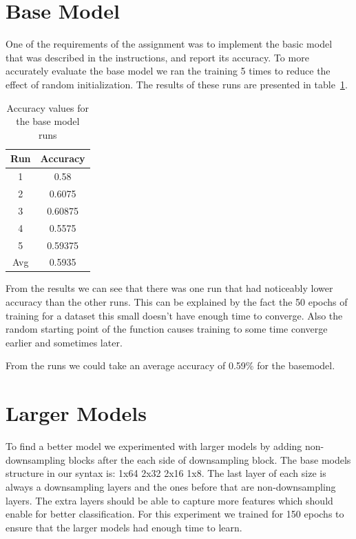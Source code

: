 \documentclass[12pt,a4paper,english
]{tunithesis}
\begin{document}
\section{Base Model}
One of the requirements of the assignment was to implement the basic model that was described in the instructions, and report its accuracy. To more accurately evaluate the base model we ran the training 5 times to reduce the effect of random initialization. The results of these runs are presented in table~\ref{tab:basemodel}.

\begin{table}[h!]
\centering
\caption{Accuracy values for the base model runs}
\begin{tabular}{|c|c|}
\hline
Run & Accuracy \\
\hline
1 & 0.58 \\
2 & 0.6075 \\
3 & 0.60875 \\
4 & 0.5575 \\
5 & 0.59375 \\
\hline
Avg & 0.5935 \\
\hline
\end{tabular}
\label{tab:basemodel}
\end{table}

From the results we can see that there was one run that had noticeably lower accuracy than the other runs. This can be explained by the fact the 50 epochs of training for a dataset this small doesn't have enough time to converge. Also the random starting point of the function causes training to some time converge earlier and sometimes later.

From the runs we could take an average accuracy of 0.59\% for the basemodel.

\section{Larger Models}

To find a better model we experimented with larger models by adding non-downsampling blocks after the each side of downsampling block. The base models structure in our syntax is: 1x64 2x32 2x16 1x8. The last layer of each size is always a downsampling layers and the ones before that are non-downsampling layers. The extra layers should be able to capture more features which should enable for better classification. For this experiment we trained for 150 epochs to ensure that the larger models had enough time to learn.
\end{document}
